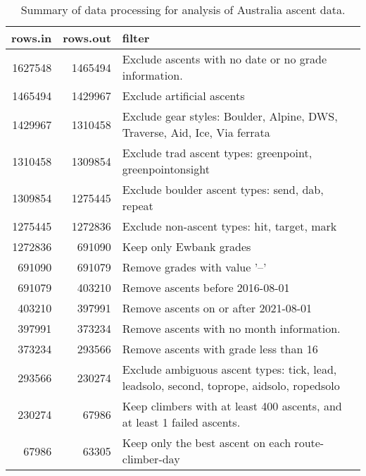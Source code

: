 \begin{table}[ht]
\centering
\begingroup\fontsize{9pt}{10pt}\selectfont
\begin{tabular}{rrl}
  \hline
{\bf rows.in} & {\bf rows.out} & {\bf filter} \\ 
  \hline
1627548 & 1465494 & Exclude ascents with no date or no grade information. \\ 
  1465494 & 1429967 & Exclude artificial ascents \\ 
  1429967 & 1310458 & Exclude gear styles: Boulder, Alpine, DWS, Traverse, Aid, Ice, Via ferrata \\ 
  1310458 & 1309854 & Exclude trad ascent types: greenpoint, greenpointonsight \\ 
  1309854 & 1275445 & Exclude boulder ascent types: send, dab, repeat \\ 
  1275445 & 1272836 & Exclude non-ascent types: hit, target, mark \\ 
  1272836 & 691090 & Keep only Ewbank grades \\ 
  691090 & 691079 & Remove grades with value '--' \\ 
  691079 & 403210 & Remove ascents before 2016-08-01 \\ 
  403210 & 397991 & Remove ascents on or after 2021-08-01 \\ 
  397991 & 373234 & Remove ascents with no month information. \\ 
  373234 & 293566 & Remove ascents with grade less than 16 \\ 
  293566 & 230274 & Exclude ambiguous ascent types: tick, lead, leadsolo, second, toprope, aidsolo, ropedsolo \\ 
  230274 & 67986 & Keep climbers with at least 400 ascents, and at least 1 failed ascents. \\ 
  67986 & 63305 & Keep only the best ascent on each route-climber-day \\ 
   \hline
\end{tabular}
\endgroup
\caption{Summary of data processing for analysis of Australia ascent data.} 
\label{table-data-processing-aus}
\end{table}
